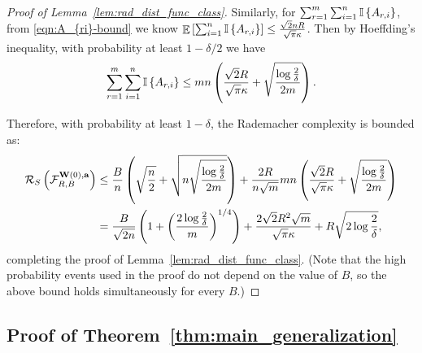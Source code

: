 \begin{proof}[Proof of Lemma~\ref{lem:rad_dist_func_class}]
Similarly, for $\sum_{r=1}^m \sum_{i=1}^n  \mathbb{I}\left\{A_{r, i}\right\}$, from \eqref{eqn:A_{ri}-bound} we know $\mathop\mathbb{E}\left[ \sum_{i=1}^n  \mathbb{I}\left\{A_{r, i}\right\} \right] \le \frac{\sqrt 2 n R}{\sqrt\pi \kappa}$. Then by Hoeffding's inequality, with probability at least $1-\delta/2$ we have
\begin{align*}
\sum_{r=1}^m \sum_{i=1}^n  \mathbb{I}\left\{A_{r, i}\right\} \le mn \left( \frac{\sqrt 2  R}{\sqrt\pi \kappa} + \sqrt{\frac{\log \frac2\delta}{2m}} \right).
\end{align*}

Therefore, with probability at least $1-\delta$, the Rademacher complexity is bounded as:
\begin{align*}
\mathcal{R}_S\left( \mathcal{F}^{\mathbf{W}(0),\mathbf{a}}_{R,B} \right)
&\le \frac Bn \left( \sqrt{\frac n2} + \sqrt{n\sqrt{\frac{\log \frac2\delta}{2m}}} \right) + \frac{2R}{n\sqrt{m}} mn \left( \frac{\sqrt 2  R}{\sqrt\pi \kappa} + \sqrt{\frac{\log \frac2\delta}{2m}} \right) \\
&= \frac{B}{\sqrt{2n}} \left(1+\left( \frac{2\log \frac2\delta}{m} \right)^{1/4} \right)  + \frac{2\sqrt 2 R^2 \sqrt m}{\sqrt\pi \kappa} + R \sqrt{2\log \frac2\delta},
\end{align*}
completing the proof of Lemma~\ref{lem:rad_dist_func_class}.
(Note that the high probability events used in the proof do not depend on the value of $B$, so the above bound holds simultaneously for every $B$.)
\end{proof}













\subsection{Proof of Theorem~\ref{thm:main_generalization}} \label{app:proof-thm:main_generalization}

